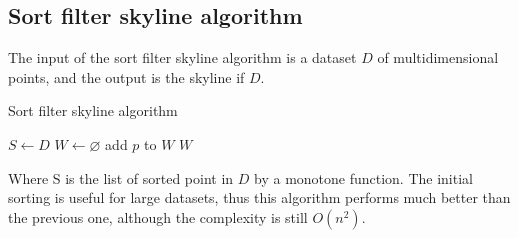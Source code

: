 \documentclass[12pt, a4paper]{report}
\newtheorem[style=M,bodystyle=\normalfont]{theorem}{Theorem}
\newtheorem[style=M,bodystyle=\normalfont]{corollary}{Corollary}
\newtheorem[style=M,bodystyle=\normalfont]{lemma}{Lemma}
\newtheorem[style=M,bodystyle=\normalfont]{definition}{Definition}
\begin{document}
    \subsection{Sort filter skyline algorithm}
    The input of the sort filter skyline algorithm is a dataset $D$ of multidimensional points, and the output is the skyline if $D$.
    \begin{algorithm}[H]
        \caption{Sort filter skyline algorithm}
            \begin{algorithmic}[1]
                \State $S \leftarrow D$
                \State $W \leftarrow \varnothing$
                        \State add $p$ to $W$
                    \EndIf
                \EndFor
                \State \Return $W$
            \end{algorithmic}
    \end{algorithm}
    Where S is the list of sorted point in $D$ by a monotone function. The initial sorting is useful for large datasets, thus this algorithm performs much better than the
    previous one, although the complexity is still $O(n^2)$. 
\end{document}
